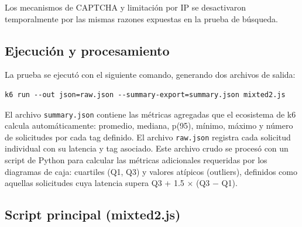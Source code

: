 Los mecanismos de CAPTCHA y limitación por IP se desactivaron temporalmente por las mismas razones expuestas en la prueba de búsqueda.

\subsection{Ejecución y procesamiento}

La prueba se ejecutó con el siguiente comando, generando dos archivos de salida:

\begin{verbatim}
k6 run --out json=raw.json --summary-export=summary.json mixted2.js
\end{verbatim}

El archivo \texttt{summary.json} contiene las métricas agregadas que el ecosistema de k6 calcula automáticamente: promedio, mediana, p(95), mínimo, máximo y número de solicitudes por cada tag definido. El archivo \texttt{raw.json} registra cada solicitud individual con su latencia y tag asociado. Este archivo crudo se procesó con un script de Python para calcular las métricas adicionales requeridas por los diagramas de caja: cuartiles (Q1, Q3) y valores atípicos (outliers), definidos como aquellas solicitudes cuya latencia supera Q3 + 1.5 $\times$ (Q3 $-$ Q1).

\subsection{Script principal (mixted2.js)}

